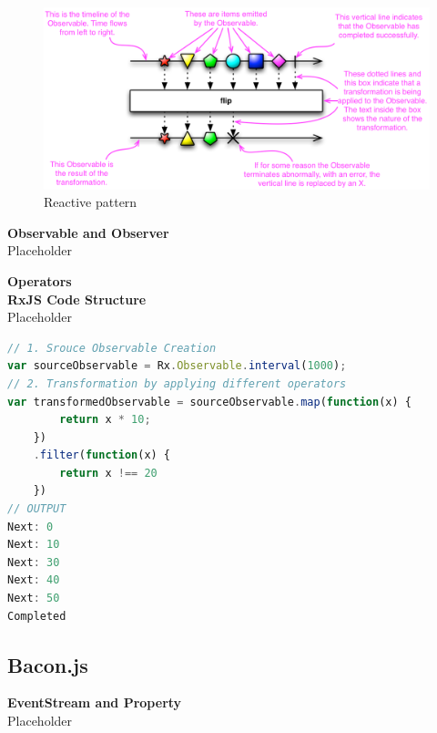


\begin{figure}[!h]
	\centering
	\includegraphics[scale=0.5,trim=0 0 0 0]{gfx/rxjs-reactive-pattern2.png}
	\caption{Reactive pattern \protect\cite{ReactiveXobservable}}
	\label{fig:rxjs-reactive-pattern}
\end{figure}

\textbf{Observable and Observer}\\
Placeholder

\textbf{Operators}
\label{subsec:Operators}\\

\textbf{RxJS Code Structure}\\
Placeholder
\begin{lstlisting}[language=JavaScript, caption=RxJS Simple Example, label={lst:RxJS_Simple_Example}]
// 1. Srouce Observable Creation
var sourceObservable = Rx.Observable.interval(1000);
// 2. Transformation by applying different operators
var transformedObservable = sourceObservable.map(function(x) {
		return x * 10;
	})
	.filter(function(x) {
		return x !== 20
	})
// OUTPUT
Next: 0
Next: 10
Next: 30
Next: 40
Next: 50
Completed
\end{lstlisting}

\subsection{Bacon.js}

\textbf{EventStream and Property}\\
Placeholder

